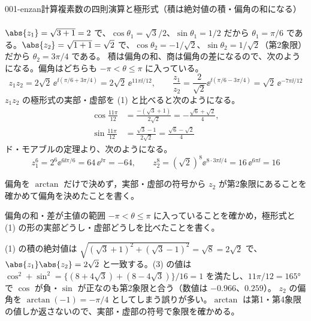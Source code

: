 \documentclass[uplatex,dvipdfmx,a4paper,11pt]{jsarticle}
\begin{document}
\begin{mondai}{001-enzan}{計算}{複素数の四則演算と極形式（積は絶対値の積・偏角の和になる）}
\begin{tadashii}
\begin{align*}
\end{align*}
 $\abs{z_{1}}=\sqrt{3+1}=2$ で、$\cos\theta_{1}=\sqrt{3}/2$、$\sin\theta_{1}=1/2$ だから $\theta_{1}=\pi/6$ である。$\abs{z_{2}}=\sqrt{1+1}=\sqrt{2}$ で、$\cos\theta_{2}=-1/\sqrt{2}$、$\sin\theta_{2}=1/\sqrt{2}$（第2象限）だから $\theta_{2}=3\pi/4$ である。
 積は偏角の和、商は偏角の差になるので、次のようになる。偏角はどちらも $-\pi<\theta\le\pi$ に入っている。
\[ z_{1}z_{2}=2\sqrt{2}\,\ee^{\ii(\pi/6+3\pi/4)}=2\sqrt{2}\,\ee^{11\pi\ii/12},\qquad \frac{z_{1}}{z_{2}}=\frac{2}{\sqrt{2}}\ee^{\ii(\pi/6-3\pi/4)}=\sqrt{2}\,\ee^{-7\pi\ii/12} \]
$z_{1}z_{2}$ の極形式の実部・虚部を (1) と比べると次のようになる。
\begin{align*}
  \cos\frac{11\pi}{12}&=\frac{-(\sqrt{3}+1)}{2\sqrt{2}}=-\frac{\sqrt{6}+\sqrt{2}}{4},\\
  \sin\frac{11\pi}{12}&=\frac{\sqrt{3}-1}{2\sqrt{2}}=\frac{\sqrt{6}-\sqrt{2}}{4}
\end{align*}
 ド・モアブルの定理より、次のようになる。
\[ z_{1}^{6}=2^{6}\ee^{6\ii\pi/6}=64\,\ee^{\ii\pi}=-64,\qquad z_{2}^{8}=(\sqrt{2})^{8}\ee^{8\cdot3\pi\ii/4}=16\,\ee^{6\pi\ii}=16 \]
\begin{ronten}
  \item {} 偏角を $\arctan$ だけで決めず，実部・虚部の符号から $z_{2}$ が第2象限にあることを確かめて偏角を決めたことを書く。
  \item {} 偏角の和・差が主値の範囲 $-\pi<\theta\le\pi$ に入っていることを確かめ，極形式と (1) の形の実部どうし・虚部どうしを比べたことを書く。
\end{ronten}
\kenzan (1) の積の絶対値は $\sqrt{(\sqrt{3}+1)^{2}+(\sqrt{3}-1)^{2}}=\sqrt{8}=2\sqrt{2}$ で、$\abs{z_{1}}\abs{z_{2}}=2\sqrt{2}$ と一致する。(3) の値は $\cos^{2}+\sin^{2}=\{(8+4\sqrt{3})+(8-4\sqrt{3})\}/16=1$ を満たし、$11\pi/12=\ang{165}$ で $\cos$ が負・$\sin$ が正なのも第2象限と合う（数値は $-0.966$、$0.259$）。
\tsumazuki $z_{2}$ の偏角を $\arctan(-1)=-\pi/4$ としてしまう誤りが多い。$\arctan$ は第1・第4象限の値しか返さないので、実部・虚部の符号で象限を確かめる。
\end{tadashii}
\end{mondai}
\end{document}
